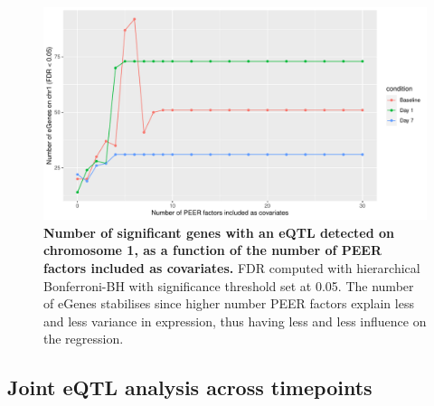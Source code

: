 \begin{figure}
    \centering
    \includegraphics[width=1.0\textwidth,page=1]{mainmatter/figures/chapter_03/count_eGenes.signif_eGenes_vs_PEER_n.dataset_mega.chr_chr1.pdf}
    \caption{
        \textbf{Number of significant genes with an \gls{eQTL} detected on chromosome 1, as a function of the number of PEER factors included as covariates.}
        \gls{FDR} computed with hierarchical Bonferroni-\gls{BH} \autocite{huang2018PowerFalseDiscovery} with significance threshold set at 0.05.
        The number of eGenes stabilises since higher number PEER factors explain less and less variance in expression, thus having less and less influence on the regression.
    }
    \label{fig:hird_neGenesvsPeerK}
\end{figure}

\subsection{Joint eQTL analysis across timepoints}
\label{subsec:hird_reQTL_mashr}

